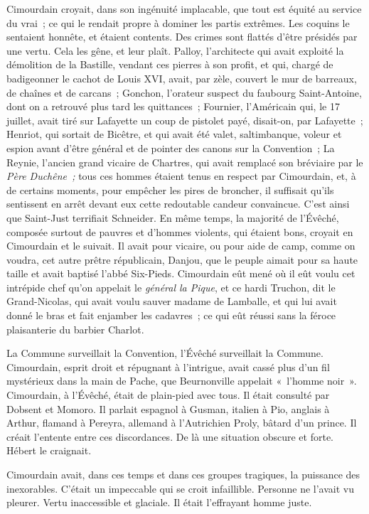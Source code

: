 \documentclass[french,twoside]{book} %
\begin{document}
Cimourdain croyait, dans son ingénuité implacable, que tout est équité au service du vrai ; ce qui le rendait propre à dominer les partis extrêmes. Les coquins le sentaient honnête, et étaient contents. Des crimes sont flattés d’être présidés par une vertu. Cela les gêne, et leur plaît. Palloy, l’architecte qui avait exploité la démolition de la Bastille, vendant ces pierres à son profit, et qui, chargé de badigeonner le cachot de Louis XVI, avait, par zèle, couvert le mur de barreaux, de chaînes et de carcans ; Gonchon, l’orateur suspect du faubourg Saint-Antoine, dont on a retrouvé plus tard les quittances ; Fournier, l’Américain qui, le 17 juillet, avait tiré sur Lafayette un coup de pistolet payé, disait-on, par Lafayette ; Henriot, qui sortait de Bicêtre, et qui avait été valet,  saltimbanque, voleur et espion avant d’être général et de pointer des canons sur la Convention ; La Reynie, l’ancien grand vicaire de Chartres, qui avait remplacé son bréviaire par le \emph{Père Duchêne ;} tous ces hommes étaient tenus en respect par Cimourdain, et, à de certains moments, pour empêcher les pires de broncher, il suffisait qu’ils sentissent en arrêt devant eux cette redoutable candeur convaincue. C’est ainsi que Saint-Just terrifiait Schneider. En même temps, la majorité de l’Évêché, composée surtout de pauvres et d’hommes violents, qui étaient bons, croyait en Cimourdain et le suivait. Il avait pour vicaire, ou pour aide de camp, comme on voudra, cet autre prêtre républicain, Danjou, que le peuple aimait pour sa haute taille et avait baptisé l’abbé Six-Pieds. Cimourdain eût mené où il eût voulu cet intrépide chef qu’on appelait le \emph{général la Pique}, et ce hardi Truchon, dit le Grand-Nicolas, qui avait voulu sauver madame de Lamballe, et qui lui avait donné le bras et fait enjamber les cadavres ; ce qui eût réussi sans la féroce plaisanterie du barbier Charlot.\par
La Commune surveillait la Convention, l’Évêché surveillait la Commune. Cimourdain, esprit droit et répugnant à l’intrigue, avait cassé plus d’un fil mystérieux dans la main de Pache, que Beurnonville appelait « l’homme noir ». Cimourdain, à l’Évêché, était de plain-pied avec tous. Il était consulté par Dobsent et Momoro. Il parlait espagnol à Gusman, italien à Pio, anglais à Arthur, flamand à Pereyra, allemand à l’Autrichien Proly, bâtard d’un prince. Il créait  l’entente entre ces discordances. De là une situation obscure et forte. Hébert le craignait.\par
Cimourdain avait, dans ces temps et dans ces groupes tragiques, la puissance des inexorables. C’était un impeccable qui se croit infaillible. Personne ne l’avait vu pleurer. Vertu inaccessible et glaciale. Il était l’effrayant homme juste.\par
\end{document}
